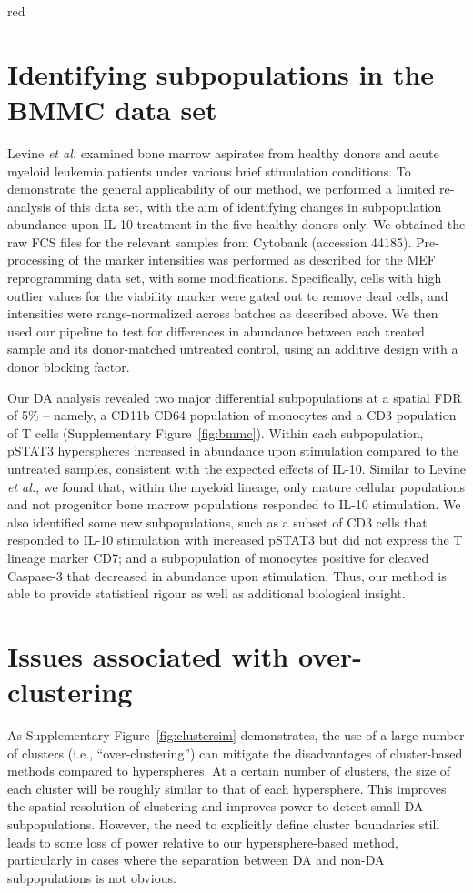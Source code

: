 \documentclass{article}
\begin{document}
\begin{color}{red}
\section{Identifying subpopulations in the BMMC data set}
\label{sec:bmmc}
Levine \textit{et al.} \cite{levine2015datadriven} examined bone marrow aspirates from healthy donors and acute myeloid leukemia patients under various brief stimulation conditions.
To demonstrate the general applicability of our method, we performed a limited re-analysis of this data set, with the aim of identifying changes in subpopulation abundance upon IL-10 treatment in the five healthy donors only.
We obtained the raw FCS files for the relevant samples from Cytobank (accession 44185).
Pre-processing of the marker intensities was performed as described for the MEF reprogramming data set, with some modifications.
Specifically, cells with high outlier values for the viability marker were gated out to remove dead cells, and intensities were range-normalized across batches as described above.
We then used our pipeline to test for differences in abundance between each treated sample and its donor-matched untreated control, using an additive design with a donor blocking factor.

Our DA analysis revealed two major differential subpopulations at a spatial FDR of 5\% -- namely, a CD11b\hi{} CD64\hi{} population of monocytes and a CD3\hi{} population of T cells (Supplementary Figure~\ref{fig:bmmc}).
Within each subpopulation, pSTAT3\hi{} hyperspheres increased in abundance upon stimulation compared to the untreated samples, consistent with the expected effects of IL-10.
Similar to Levine \textit{et al.}, we found that, within the myeloid lineage, only mature cellular populations and not progenitor bone marrow populations responded to IL-10 stimulation.
We also identified some new subpopulations, such as a subset of CD3\hi{} cells that responded to IL-10 stimulation with increased pSTAT3 but did not express the T lineage marker CD7; and a subpopulation of monocytes positive for cleaved Caspase-3 that decreased in abundance upon stimulation.
Thus, our method is able to provide statistical rigour as well as additional biological insight.

\section{Issues associated with over-clustering}
As Supplementary Figure~\ref{fig:clustersim} demonstrates, the use of a large number of clusters (i.e., ``over-clustering'') can mitigate the disadvantages of cluster-based methods compared to hyperspheres.
At a certain number of clusters, the size of each cluster will be roughly similar to that of each hypersphere.
This improves the spatial resolution of clustering and improves power to detect small DA subpopulations.
However, the need to explicitly define cluster boundaries still leads to some loss of power relative to our hypersphere-based method, particularly in cases where the separation between DA and non-DA subpopulations is not obvious.


\end{color}
\end{document}
